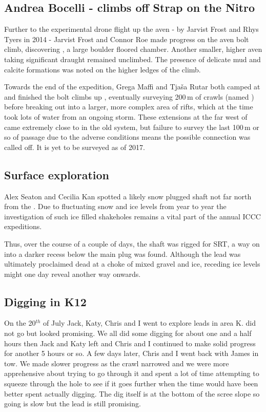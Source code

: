 \subsection{Andrea Bocelli - climbs off Strap on the Nitro}
Further to the experimental drone flight up the  aven - by Jarvist Frost and Rhys Tyers in 2014 - Jarvist Frost and Connor Roe made progress on the aven bolt climb, discovering , a large boulder floored chamber. Another smaller, higher aven taking significant draught remained unclimbed. The presence of delicate mud and calcite formations was noted on the higher ledges of the climb.

Towards the end of the expedition, Grega Maffi and Tja\v{s}a Rutar both camped at 
 and finished the bolt climbs up , eventually surveying 200\,m of crawls (named ) before breaking out into a larger, more complex area of rifts, which at the time took lots of water from an ongoing storm. These extensions at the far west of  came extremely close to  in the old system, but failure to survey the last 100\,m or so of passage due to the adverse conditions means the possible connection was called off. It is yet to be surveyed as of 2017.

\subsection{Surface exploration}
Alex Seaton and Cecilia Kan spotted a likely snow plugged shaft not far north from the . Due to fluctuating snow and ice levels from year to year the investigation of such ice filled shakeholes remains a vital part of the annual ICCC expeditions. 

Thus, over the course of a couple of days, the shaft was rigged for SRT, a way on into a darker recess below the main plug was found. Although the lead was ultimately proclaimed dead at a choke of mixed gravel and ice, receding ice levels might one day reveal another way onwards. 

\subsection{Digging in K12}

On the 20$^{th}$ of July Jack, Katy, Chris and I went to explore leads in area K.  did not go but  looked promising.  We all did some digging for about one and a half hours then Jack and Katy left and Chris and I continued to make solid progress for another 5 hours or so. A few days later, Chris and I went back with James in tow. We made slower progress as the crawl narrowed and we were more apprehensive about trying to go through it and spent a lot of time attempting to squeeze through the hole to see if it goes further when the time would have been better spent actually digging. The dig itself is at the bottom of the scree slope so going is slow but the lead is still promising. 

